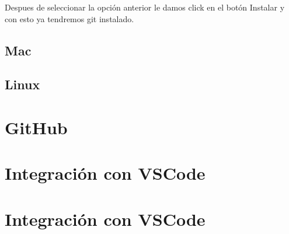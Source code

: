 \documentclass[11pt, oneside]{article}
\begin{document}
Despues de seleccionar la opción anterior le damos click en el botón Instalar y con esto ya tendremos git instalado.

\subsection{Mac}


\subsection{Linux}


\section{GitHub}


\section{Integración con VSCode}

\section{Integración con VSCode}
\end{document}
